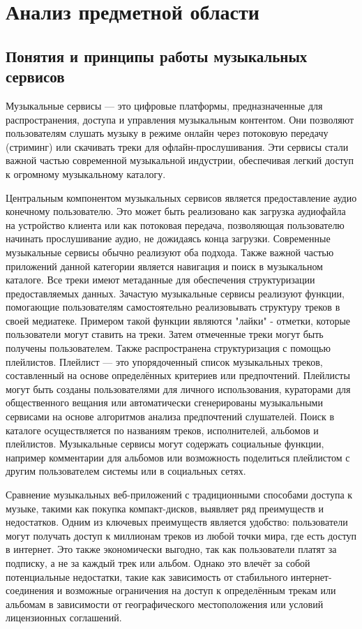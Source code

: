 \section{Анализ предметной области}

\subsection{Понятия и принципы работы музыкальных сервисов}

Музыкальные сервисы — это цифровые платформы, предназначенные для распространения, доступа и управления музыкальным контентом. Они позволяют пользователям слушать музыку в режиме онлайн через потоковую передачу (стриминг) или скачивать треки для офлайн-прослушивания. Эти сервисы стали важной частью современной музыкальной индустрии, обеспечивая легкий доступ к огромному музыкальному каталогу\cite{mus1}.

Центральным компонентом музыкальных сервисов является предоставление аудио конечному пользователю. Это может быть реализовано как загрузка аудиофайла на устройство клиента или как потоковая передача, позволяющая пользователю начинать прослушивание аудио, не дожидаясь конца загрузки. Современные музыкальные сервисы обычно реализуют оба подхода. Также важной частью приложений данной категории является навигация и поиск в музыкальном каталоге. Все треки имеют метаданные для обеспечения структуризации предоставляемых данных. Зачастую музыкальные сервисы реализуют функции, помогающие пользователям самостоятельно реализовывать структуру треков в своей медиатеке. Примером такой функции являются "лайки" - отметки, которые пользователи могут ставить на треки. Затем отмеченные треки могут быть получены пользователем. Также распространена структуризация с помощью плейлистов. Плейлист — это упорядоченный список музыкальных треков, составленный на основе определённых критериев или предпочтений. Плейлисты могут быть созданы пользователями для личного использования, кураторами для общественного вещания или автоматически сгенерированы музыкальными сервисами на основе алгоритмов анализа предпочтений слушателей. Поиск в каталоге осуществляется по названиям треков, исполнителей, альбомов и плейлистов. Музыкальные сервисы могут содержать социальные функции, например комментарии для альбомов или возможность поделиться плейлистом с другим пользователем системы или в социальных сетях. 

Сравнение музыкальных веб-приложений с традиционными способами доступа к музыке, такими как покупка компакт-дисков, выявляет ряд преимуществ и недостатков. Одним из ключевых преимуществ является удобство: пользователи могут получать доступ к миллионам треков из любой точки мира, где есть доступ в интернет. Это также экономически выгодно, так как пользователи платят за подписку, а не за каждый трек или альбом. Однако это влечёт за собой потенциальные недостатки, такие как зависимость от стабильного интернет-соединения и возможные ограничения на доступ к определённым трекам или альбомам в зависимости от географического местоположения или условий лицензионных соглашений.

